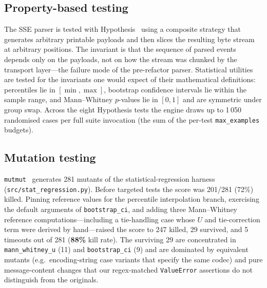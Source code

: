 \documentclass[sigconf,nonacm]{acmart}
\begin{document}
\subsection{Property-based testing}
The SSE parser is tested with Hypothesis~\cite{hypothesis} using a composite
strategy that generates arbitrary printable payloads and then slices the
resulting byte stream at arbitrary positions. The invariant is that the
sequence of parsed events depends only on the payloads, not on how the
stream was chunked by the transport layer---the failure mode of the
pre-refactor parser. Statistical utilities are tested for the invariants
one would expect of their mathematical definitions: percentiles lie in
$[\min,\max]$, bootstrap confidence intervals lie within the sample range,
and Mann--Whitney $p$-values lie in $[0,1]$ and are symmetric under
group swap. Across the eight Hypothesis tests the engine draws up to 1\,050
randomised cases per full suite invocation (the sum of the
per-test \texttt{max\_examples} budgets).

\subsection{Mutation testing}
\texttt{mutmut}~\cite{mutmut} generates 281 mutants of the
statistical-regression harness (\texttt{src/stat\_regression.py}). Before
targeted tests the score was 201/281 (72\%) killed. Pinning reference
values for the percentile interpolation branch, exercising the default
arguments of \texttt{bootstrap\_ci}, and adding three Mann--Whitney
reference computations---including a tie-handling case whose $U$ and
tie-correction term were derived by hand---raised the score to 247
killed, 29 survived, and 5 timeouts out of 281 (\textbf{88\%} kill
rate). The surviving 29 are concentrated in \texttt{mann\_whitney\_u}
(11) and \texttt{bootstrap\_ci} (9) and are dominated by equivalent
mutants (e.g.~encoding-string case variants that specify the same
codec) and pure message-content changes that our regex-matched
\texttt{ValueError} assertions do not distinguish from the originals.
\end{document}
